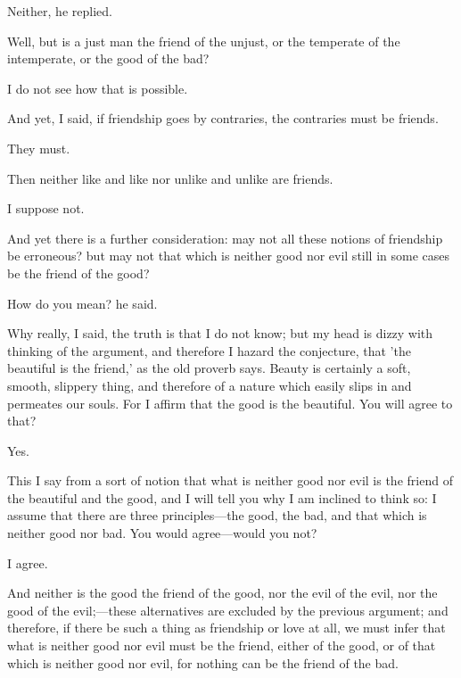 \documentclass[11pt,letter]{article}
\begin{document}
\par  Neither, he replied.

\par  Well, but is a just man the friend of the unjust, or the temperate of the intemperate, or the good of the bad?

\par  I do not see how that is possible.

\par  And yet, I said, if friendship goes by contraries, the contraries must be friends.

\par  They must.

\par  Then neither like and like nor unlike and unlike are friends.

\par  I suppose not.

\par  And yet there is a further consideration: may not all these notions of friendship be erroneous? but may not that which is neither good nor evil still in some cases be the friend of the good?

\par  How do you mean? he said.

\par  Why really, I said, the truth is that I do not know; but my head is dizzy with thinking of the argument, and therefore I hazard the conjecture, that 'the beautiful is the friend,' as the old proverb says. Beauty is certainly a soft, smooth, slippery thing, and therefore of a nature which easily slips in and permeates our souls. For I affirm that the good is the beautiful. You will agree to that?

\par  Yes.

\par  This I say from a sort of notion that what is neither good nor evil is the friend of the beautiful and the good, and I will tell you why I am inclined to think so: I assume that there are three principles—the good, the bad, and that which is neither good nor bad. You would agree—would you not?

\par  I agree.

\par  And neither is the good the friend of the good, nor the evil of the evil, nor the good of the evil;—these alternatives are excluded by the previous argument; and therefore, if there be such a thing as friendship or love at all, we must infer that what is neither good nor evil must be the friend, either of the good, or of that which is neither good nor evil, for nothing can be the friend of the bad.
\end{document}
